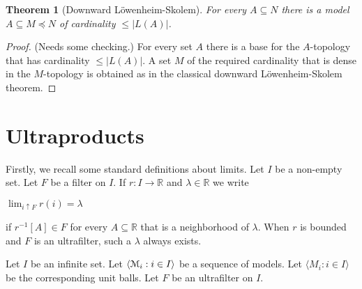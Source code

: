 \documentclass[12pt,letterpaper,oneside,reqno]{amsart}
\theoremstyle{plain}
\newtheorem{theorem}{Theorem}%
\newtheorem{remark}[theorem]{Remark}
\theoremstyle{remark}
\begin{document}

\begin{theorem}[Downward L\"owenheim-Skolem] For every $A\subseteq N$ there is a model $A\subseteq M\preceq N$ of cardinality $\le |L(A)|$.
\end{theorem}
\begin{proof} (Needs some checking.)
  For every set $A$ there is a base for the $A\mbox{-}$topology that has cardinality $\le |L(A)|$. A set $M$ of the required cardinality that is dense in the  $M\mbox{-}$topology is obtained as in the classical downward L\"owenheim-Skolem theorem.
\end{proof}

\section{Ultraproducts}\label{ultrapws}



Firstly, we recall some standard definitions about limits.
Let $I$ be a non-empty set.
Let $F$ be a filter on $I$.
If $r:I\to{\mathds R}$ and $\lambda\in{\mathds R}$ we write

\hfil$\displaystyle \lim_{i\uparrow F}r(i)=\lambda$

if $r^{-1}[A]\in F$ for every $A\subseteq{\mathds R}$ that is a neighborhood of $\lambda$.
When $r$ is bounded and $F$ is an ultrafilter, such a $\lambda$ always exists.

Let $I$ be an infinite set.
Let $\langle {\EuScript M}_i:i\in I\rangle$ be a sequence of models.
Let $\langle M_i:i\in I\rangle$ be the corresponding unit balls.
Let $F$ be an ultrafilter on $I$.
\end{document}
